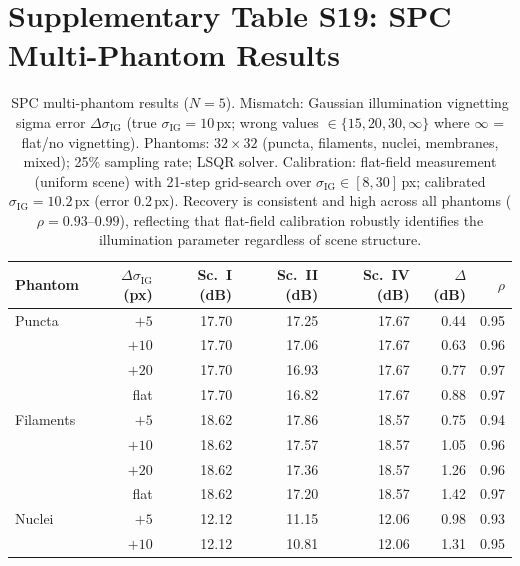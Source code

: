 \documentclass[11pt]{article}
\begin{document}

\section{Supplementary Table S19: SPC Multi-Phantom Results}
\label{sec:spc_scenes}

\begin{table}[htbp]
\centering
\caption{SPC multi-phantom results ($N{=}5$). Mismatch: Gaussian illumination vignetting sigma error $\Delta\sigma_\mathrm{IG}$
(true $\sigma_\mathrm{IG}{=}10$\,px; wrong values $\in \{15, 20, 30, \infty\}$ where $\infty$ = flat/no vignetting).
Phantoms: $32{\times}32$ (puncta, filaments, nuclei, membranes, mixed); 25\% sampling rate; LSQR solver.
Calibration: flat-field measurement (uniform scene) with 21-step grid-search over $\sigma_\mathrm{IG} \in [8, 30]$\,px;
calibrated $\sigma_\mathrm{IG}{=}10.2$\,px (error 0.2\,px).
Recovery is consistent and high across all phantoms ($\rho{=}0.93$--$0.99$), reflecting
that flat-field calibration robustly identifies the illumination parameter regardless of scene structure.}
\label{tab:spc_scenes}
\small
\begin{tabular}{l r r r r r r}
\toprule
Phantom & $\Delta\sigma_\mathrm{IG}$ (px) & Sc.~I (dB) & Sc.~II (dB) & Sc.~IV (dB) & $\Delta$(dB) & $\rho$ \\
\midrule
Puncta       & $+5$    & 17.70 & 17.25 & 17.67 & 0.44 & 0.95 \\
             & $+10$   & 17.70 & 17.06 & 17.67 & 0.63 & 0.96 \\
             & $+20$   & 17.70 & 16.93 & 17.67 & 0.77 & 0.97 \\
             & flat    & 17.70 & 16.82 & 17.67 & 0.88 & 0.97 \\
Filaments    & $+5$    & 18.62 & 17.86 & 18.57 & 0.75 & 0.94 \\
             & $+10$   & 18.62 & 17.57 & 18.57 & 1.05 & 0.96 \\
             & $+20$   & 18.62 & 17.36 & 18.57 & 1.26 & 0.96 \\
             & flat    & 18.62 & 17.20 & 18.57 & 1.42 & 0.97 \\
Nuclei       & $+5$    & 12.12 & 11.15 & 12.06 & 0.98 & 0.93 \\
             & $+10$   & 12.12 & 10.81 & 12.06 & 1.31 & 0.95 \\

\end{tabular}
\end{table}
\end{document}
